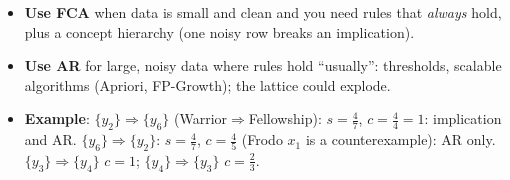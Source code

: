 \documentclass[10pt]{article}
\newcommand{\kw}[1]{\textbf{#1}}
\newcommand{\n}[1]{\,{\color{h2}\bfseries#1)}\,}
\newcommand{\up}{^{\uparrow}}
\newcommand{\dn}{^{\downarrow}}
\begin{document}
\begin{multicols*}{4}
\begin{itemize}
\begin{itemize}
\item \n1An implication $Z_1\Rightarrow Z_2$ is an AR with confidence 100\%: valid $\iff Z_1\dn\subseteq Z_2\dn\iff\sigma(Z_1\cup Z_2)=\sigma(Z_1)\iff c=1$.
\item \n2Concept intents = \kw{closed itemsets}; $s(Z)=s(Z\dn{}\up)$, so the lattice stores every support (frequent intents = iceberg lattice).
\item \n3Duquenne--Guigues basis = minimal set of \emph{exact} rules ($c=1$); AR mining adds \emph{partial} rules ($c<1$) above minSup/minConf.
\end{itemize}
\item \kw{Use FCA} when data is small and clean and you need rules that \emph{always} hold, plus a concept hierarchy (one noisy row breaks an implication).
\item \kw{Use AR} for large, noisy data where rules hold ``usually'': thresholds, scalable algorithms (Apriori, FP-Growth); the lattice could explode.
\item \kw{Example}: $\{y_2\}\Rightarrow\{y_6\}$ (Warrior$\Rightarrow$Fellowship): $s=\frac47$, $c=\frac44=1$: implication and AR. $\{y_6\}\Rightarrow\{y_2\}$: $s=\frac47$, $c=\frac45$ (Frodo $x_1$ is a counterexample): AR only. $\{y_3\}\Rightarrow\{y_4\}$ $c=1$; $\{y_4\}\Rightarrow\{y_3\}$ $c=\frac23$.
\end{itemize}



\end{multicols*}
\end{document}
